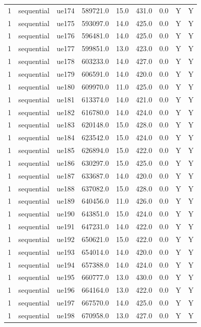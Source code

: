 \begin{table}[ht]
\begin{tabular}{|c|c|c|c|c|c|c|c|c|}
1 & sequential & ue174 & 589721.0 & 15.0 & 431.0 & 0.0 & Y & Y \\
1 & sequential & ue175 & 593097.0 & 14.0 & 425.0 & 0.0 & Y & Y \\
1 & sequential & ue176 & 596481.0 & 14.0 & 425.0 & 0.0 & Y & Y \\
1 & sequential & ue177 & 599851.0 & 13.0 & 423.0 & 0.0 & Y & Y \\
1 & sequential & ue178 & 603233.0 & 14.0 & 427.0 & 0.0 & Y & Y \\
1 & sequential & ue179 & 606591.0 & 14.0 & 420.0 & 0.0 & Y & Y \\
1 & sequential & ue180 & 609970.0 & 11.0 & 425.0 & 0.0 & Y & Y \\
1 & sequential & ue181 & 613374.0 & 14.0 & 421.0 & 0.0 & Y & Y \\
1 & sequential & ue182 & 616780.0 & 14.0 & 424.0 & 0.0 & Y & Y \\
1 & sequential & ue183 & 620148.0 & 15.0 & 428.0 & 0.0 & Y & Y \\
1 & sequential & ue184 & 623542.0 & 15.0 & 424.0 & 0.0 & Y & Y \\
1 & sequential & ue185 & 626894.0 & 15.0 & 422.0 & 0.0 & Y & Y \\
1 & sequential & ue186 & 630297.0 & 15.0 & 425.0 & 0.0 & Y & Y \\
1 & sequential & ue187 & 633687.0 & 14.0 & 420.0 & 0.0 & Y & Y \\
1 & sequential & ue188 & 637082.0 & 15.0 & 428.0 & 0.0 & Y & Y \\
1 & sequential & ue189 & 640456.0 & 11.0 & 426.0 & 0.0 & Y & Y \\
1 & sequential & ue190 & 643851.0 & 15.0 & 424.0 & 0.0 & Y & Y \\
1 & sequential & ue191 & 647231.0 & 14.0 & 422.0 & 0.0 & Y & Y \\
1 & sequential & ue192 & 650621.0 & 15.0 & 422.0 & 0.0 & Y & Y \\
1 & sequential & ue193 & 654014.0 & 14.0 & 420.0 & 0.0 & Y & Y \\
1 & sequential & ue194 & 657388.0 & 14.0 & 424.0 & 0.0 & Y & Y \\
1 & sequential & ue195 & 660777.0 & 13.0 & 430.0 & 0.0 & Y & Y \\
1 & sequential & ue196 & 664164.0 & 13.0 & 422.0 & 0.0 & Y & Y \\
1 & sequential & ue197 & 667570.0 & 14.0 & 425.0 & 0.0 & Y & Y \\
1 & sequential & ue198 & 670958.0 & 13.0 & 427.0 & 0.0 & Y & Y \\

\end{tabular}
\end{table}

